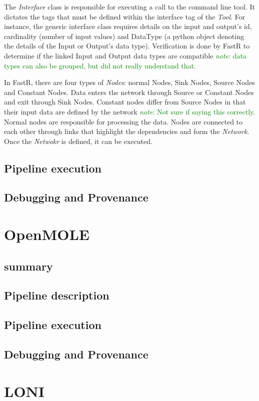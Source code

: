 \documentclass{report}
\newcommand{\note}[1]{\textcolor{green}{\textit{note}: #1}}
\begin{document}
The \textit{Interface} class is responsible for executing a call to the command line tool.
It dictates the tags that must be defined within the interface tag of the
\textit{Tool}. For instance, the generic interface class requires details on the
input and output's id, cardinality (number of input values) and DataType (a
python object denoting the details of the Input or Output's data type).
Verification is done by FastR to determine if the linked Input and Output data
types are compatible \note{data types can also be grouped, but did not really
understand that}.

In FastR, there are four types of \textit{Nodes}: normal Nodes, Sink Nodes,
Source Nodes and Constant Nodes. Data enters the network through Source or
Constant Nodes and exit through Sink Nodes. Constant nodes differ from Source
Nodes in that their input data are defined by the network \note{Not sure if
saying this correctly}. Normal nodes are responsible for processing the
data. Nodes are connected to each other through links that highlight the
dependencies and form the \textit{Network}. Once the \textit{Netwokr} is
defined, it can be executed. 

        \subsection{Pipeline execution}
        \subsection{Debugging and Provenance}
    \section{OpenMOLE}
        \subsection{summary}
        \subsection{Pipeline description}
        \subsection{Pipeline execution}
        \subsection{Debugging and Provenance}
    \section{LONI}
\end{document}
